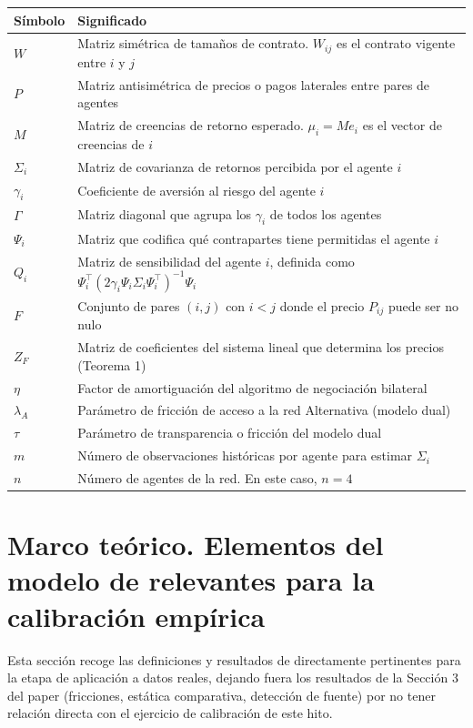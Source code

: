 \documentclass[11pt]{article}
\begin{document}
\begin{center}
\begin{tabular}{ll}
\hline
Símbolo & Significado \\
\hline
$W$ & Matriz simétrica de tamaños de contrato. $W_{ij}$ es el contrato vigente entre $i$ y $j$ \\
$P$ & Matriz antisimétrica de precios o pagos laterales entre pares de agentes \\
$M$ & Matriz de creencias de retorno esperado. $\mu_i = Me_i$ es el vector de creencias de $i$ \\
$\Sigma_i$ & Matriz de covarianza de retornos percibida por el agente $i$ \\
$\gamma_i$ & Coeficiente de aversión al riesgo del agente $i$ \\
$\Gamma$ & Matriz diagonal que agrupa los $\gamma_i$ de todos los agentes \\
$\Psi_i$ & Matriz que codifica qué contrapartes tiene permitidas el agente $i$ \\
$Q_i$ & Matriz de sensibilidad del agente $i$, definida como $\Psi_i^\top(2\gamma_i \Psi_i \Sigma_i \Psi_i^\top)^{-1}\Psi_i$ \\
$F$ & Conjunto de pares $(i,j)$ con $i<j$ donde el precio $P_{ij}$ puede ser no nulo \\
$Z_F$ & Matriz de coeficientes del sistema lineal que determina los precios (Teorema 1) \\
$\eta$ & Factor de amortiguación del algoritmo de negociación bilateral \\
$\lambda_A$ & Parámetro de fricción de acceso a la red Alternativa (modelo dual) \\
$\tau$ & Parámetro de transparencia o fricción del modelo dual \\
$m$ & Número de observaciones históricas por agente para estimar $\Sigma_i$ \\
$n$ & Número de agentes de la red. En este caso, $n=4$ \\
\hline
\end{tabular}
\end{center}

\section{Marco teórico. Elementos del modelo de \citet{jalan2024} relevantes para la calibración empírica}

Esta sección recoge las definiciones y resultados de \citet{jalan2024} directamente pertinentes para la etapa de aplicación a datos reales, dejando fuera los resultados de la Sección 3 del paper (fricciones, estática comparativa, detección de fuente) por no tener relación directa con el ejercicio de calibración de este hito.
\end{document}
